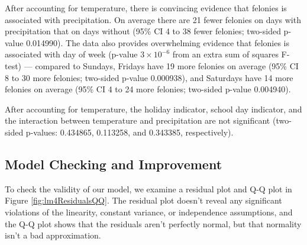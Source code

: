 \documentclass[11pt,notitlepage]{article}
\begin{document}





After accounting for temperature, there is convincing evidence that felonies is associated with precipitation. On average there are 21 fewer felonies on days with precipitation that on days without (95\% CI 4 to 38 fewer felonies; two-sided p-value 0.014990). The data also provides overwhelming evidence that felonies is associated with day of week (p-value $3 \times 10^{-6}$ from an extra sum of squares F-test) --- compared to Sundays, Fridays have 19 more felonies on average (95\% CI 8 to 30 more felonies; two-sided p-value 0.000938), and Saturdays have 14 more felonies on average (95\% CI 4 to 24 more felonies; two-sided p-value 0.004940).

After accounting for temperature, the holiday indicator, school day indicator, and the interaction between temperature and precipitation are not significant (two-sided p-values: 0.434865, 0.113258, and 0.343385, respectively).

\subsection{Model Checking and Improvement}
\label{sec:modelFeloniesModelCheckingImprovement}

To check the validity of our model, we examine a residual plot and Q-Q plot in Figure \ref{fig:lm4ResidualsQQ}. The residual plot doesn't reveal any significant violations of the linearity, constant variance, or independence assumptions, and the Q-Q plot shows that the residuals aren't perfectly normal, but that normality isn't a bad approximation.
\end{document}
